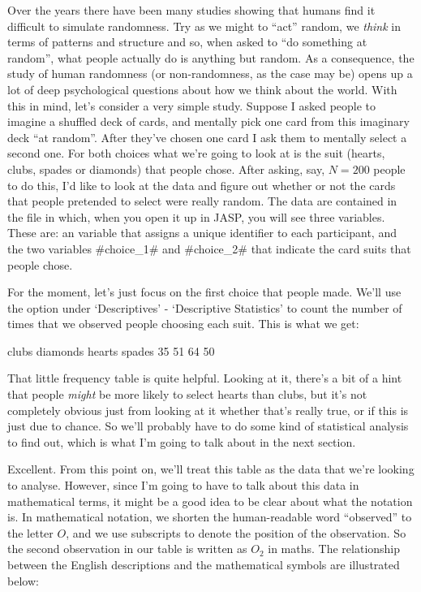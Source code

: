 
Over the years there have been many studies showing that humans find it difficult to simulate randomness. Try as we might to ``act'' random, we {\it think} in terms of patterns and structure and so, when asked to ``do something at random'', what people actually do is anything but random. As a consequence, the study of human randomness (or non-randomness, as the case may be) opens up a lot of deep psychological questions about how we think about the world. With this in mind, let's consider a very simple study. Suppose I asked people to imagine a shuffled deck of cards, and mentally pick one card from this imaginary deck ``at random''. After they've chosen one card I ask them to mentally select a second one. For both choices what we're going to look at is the suit (hearts, clubs, spades or diamonds) that people chose. After asking, say, $N=200$ people to do this, I'd like to look at the data and figure out whether or not the cards that people pretended to select were really random. The data are contained in the  file in which, when you open it up in JASP, you will see three variables. These are: an  variable that assigns a unique identifier to each participant, and the two variables \rtextverb#choice_1# and \rtextverb#choice_2# that indicate the card suits that people chose. 

For the moment, let's just focus on the first choice that people made. We'll use the  option under `Descriptives' - `Descriptive Statistics' to count the number of times that we observed people choosing each suit. This is what we get: 

\begin{rblock1}
   clubs diamonds   hearts   spades 
      35       51       64       50      
\end{rblock1}

That little frequency table is quite helpful. Looking at it, there's a bit of a hint that people {\it might} be more likely to select hearts than clubs, but it's not completely obvious just from looking at it whether that's really true, or if this is just due to chance. So we'll probably have to do some kind of statistical analysis to find out, which is what I'm going to talk about in the next section. 

Excellent. From this point on, we'll treat this table as the data that we're looking to analyse. However, since I'm going to have to talk about this data in mathematical terms, it might be a good idea to be clear about what the notation is. In mathematical notation, we shorten the human-readable word “observed” to the letter $O$, and we use subscripts to denote the position of the observation. So the second observation in our table is written as $O_2$ in maths. The relationship between the English descriptions and the mathematical symbols are illustrated below: 

